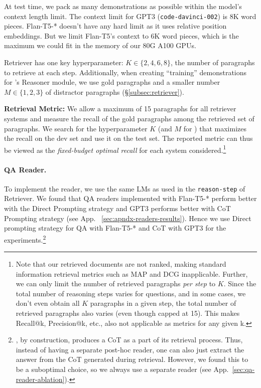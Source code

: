  At test time, we pack as many demonstrations as possible within the model's context length limit. The context limit for GPT3 (\texttt{code-davinci-002}) is 8K word pieces. Flan-T5-* doesn't have any hard limit as it uses relative position embeddings. But we limit Flan-T5's context to 6K word pieces, which is the maximum we could fit in the memory of our 80G A100 GPUs.

\iconsys Retriever has one key hyperparameter: $K \in \{2, 4, 6, 8\}$, the number of paragraphs to retrieve at each step. Additionally, when creating ``training'' demonstrations for \iconsys's Reasoner module, we use gold paragraphs and a smaller number $M \in \{1, 2, 3\}$ of distractor paragraphs (\S\ref{subsec:retriever}).

\textbf{Retrieval Metric:} We allow a maximum of 15 paragraphs for all retriever systems and measure the recall of the gold paragraphs among the retrieved set of paragraphs. We search for the hyperparameter $K$ (and $M$ for \iconsys) that maximizes the recall on the dev set and use it on the test set. The reported metric can thus be viewed as the \emph{fixed-budget optimal recall} for each system considered.\footnote{\label{footnote:retrieval-metric}Note that our retrieved documents are not ranked, making standard information retrieval metrics such as MAP and DCG inapplicable. Further, we can only limit the number of retrieved paragraphs \emph{per step} to $K$. Since the total number of reasoning steps varies for questions, and in some cases, we don't even obtain all $K$ paragraphs in a given step, the total number of retrieved paragraphs also varies (even though capped at 15). This makes Recall@k, Precision@k, etc., also not applicable as metrics for any given k.}

\paragraph{QA Reader.} To implement the reader, we use the same LMs as used in the \texttt{reason-step} of \iconsys Retriever. We found that QA readers implemented with Flan-T5-* perform better with the Direct Prompting strategy and GPT3 performs better with CoT Prompting strategy (see App. ~\ref{sec:apndx-readers-results}). Hence we use Direct prompting strategy for QA with Flan-T5-* and CoT with GPT3 for the experiments.\footnote{\iconsys, by construction, produces a CoT as a part of its retrieval process. Thus, instead of having a separate post-hoc reader, one can also just extract the answer from the CoT generated during retrieval. However, we found this to be a suboptimal choice, so we always use a separate reader (see App.~\ref{sec:qa-reader-ablation}).}

